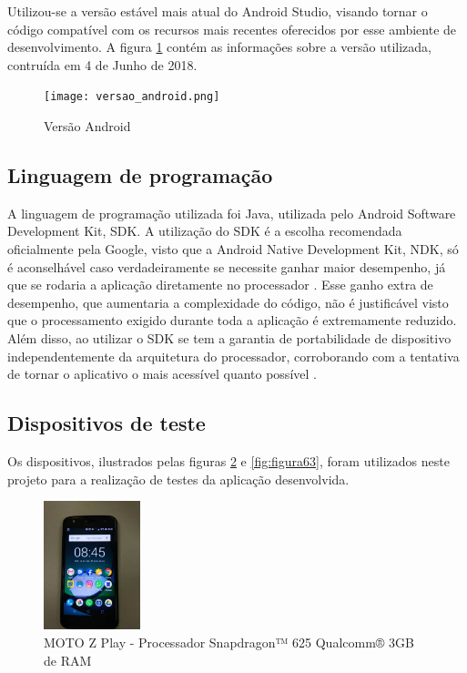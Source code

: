 Utilizou-se a versão estável mais atual do Android Studio, visando tornar o código compatível com os recursos mais recentes oferecidos por esse ambiente de desenvolvimento. A figura \ref{fig:figura61} contém as informações sobre a versão utilizada, contruída em 4 de Junho de 2018.
\begin{figure}[!ht]
	\centering
\texttt{[image: versao\_android.png]}   
	\caption{Versão Android}
	\label{fig:figura61}
\end{figure}

\subsection{Linguagem de programação}
A linguagem de programação utilizada foi Java, utilizada pelo Android Software Development Kit, SDK. A utilização do SDK é a escolha recomendada oficialmente pela Google, visto que a Android Native Development Kit, NDK, só é aconselhável caso verdadeiramente se necessite ganhar maior desempenho, já que se rodaria a aplicação diretamente no processador \citep{Android7}. Esse ganho extra de desempenho, que aumentaria a complexidade do código, não é justificável visto que o processamento exigido durante toda a aplicação é extremamente reduzido. Além disso, ao utilizar o SDK se tem a garantia de portabilidade de dispositivo independentemente da arquitetura do processador, corroborando com a tentativa de tornar o aplicativo o mais acessível quanto possível \citep{Android8}.


\subsection{Dispositivos de teste}
Os dispositivos, ilustrados pelas figuras \ref{fig:figura62} e \ref{fig:figura63}, foram utilizados neste projeto para
a realização de testes da aplicação desenvolvida.

\begin{figure}[!ht]
	\centering
\includegraphics[width=0.25\textwidth]{img/moto_z_play.jpeg}   
	\caption{MOTO Z Play - Processador Snapdragon™ 625 Qualcomm® 3GB de RAM}
	\label{fig:figura62}
\end{figure}


